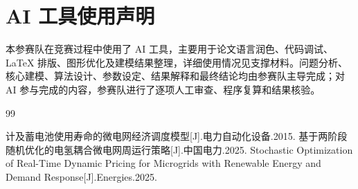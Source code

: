 
\section*{AI 工具使用声明}

本参赛队在竞赛过程中使用了 AI 工具，主要用于论文语言润色、代码调试、\LaTeX{} 排版、图形优化及建模结果整理，详细使用情况见支撑材料。问题分析、核心建模、算法设计、参数设定、结果解释和最终结论均由参赛队主导完成；对 AI 参与完成的内容，参赛队进行了逐项人工审查、程序复算和结果核验。

\vspace{0.5\baselineskip}
\begin{thebibliography}{99}

计及蓄电池使用寿命的微电网经济调度模型[J].电力自动化设备.2015.
基于两阶段随机优化的电氢耦合微电网周运行策略[J].中国电力.2025.
Stochastic Optimization of Real-Time Dynamic Pricing for Microgrids with Renewable Energy and Demand Response[J].Energies.2025.


\end{thebibliography}
